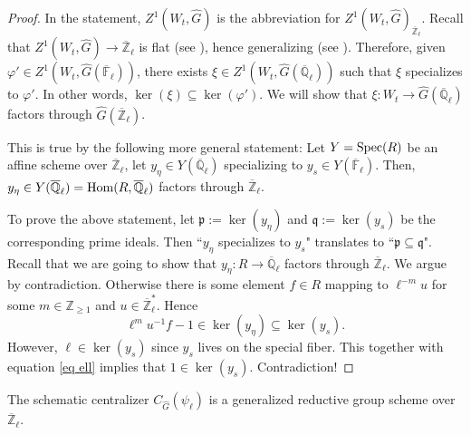 \begin{proof}
	In the statement, $Z^1(W_t, \hat{G})$ is the abbreviation for $Z^1(W_t, \hat{G})_{\overline{\mathbb{Z}}_{\ell}}$. Recall that $Z^1(W_t, \hat{G}) \to \overline{\mathbb{Z}}_{\ell}$ is flat (see \cite[Proposition 3.3]{dat2022ihes}), hence generalizing (see \cite[Stack, Tag 01U2]{stacks-project}). Therefore, given $\varphi' \in Z^1(W_t, \hat{G}(\overline{\mathbb{F}}_{\ell}))$, there exists $\xi \in Z^1(W_t, \hat{G}(\overline{\mathbb{Q}}_{\ell}))$ such that $\xi$ specializes to $\varphi'$. In other words, $\ker(\xi) \subseteq \ker(\varphi')$. We will show that $\xi: W_t \to \hat{G}(\overline{\mathbb{Q}}_{\ell})$ factors through  $\hat{G}(\overline{\mathbb{Z}}_{\ell})$.
	
	This is true by the following more general statement: Let $Y=\operatorname{\operatorname{Spec}}(R)$ be an affine scheme over $\overline{\mathbb{Z}}_{\ell}$, let $y_{\eta} \in Y(\overline{\mathbb{Q}}_{\ell})$ specializing to $y_s \in Y(\overline{\mathbb{F}}_{\ell})$.  Then, $y_{\eta} \in Y(\overline{\mathbb{Q}}_{\ell})=\operatorname{\operatorname{Hom}}(R, \overline{\mathbb{Q}}_{\ell})$ factors through $\overline{\mathbb{Z}}_{\ell}$.
	
    To prove the above statement, let $\mathfrak{p}:=\ker(y_\eta)$ and $\mathfrak{q}:=\ker(y_s)$ be the corresponding prime ideals. Then ``$y_{\eta}$ specializes to $y_s$" translates to ``$\mathfrak{p} \subseteq \mathfrak{q}$". Recall that we are going to show that $y_{\eta}: R \to \overline{\mathbb{Q}}_{\ell}$ factors through $\overline{\mathbb{Z}}_{\ell}$. We argue by contradiction. Otherwise there is some element $f \in R$ mapping to $\ell^{-m}u$ for some $m \in \mathbb{Z}_{\geq 1}$ and $u \in \overline{\mathbb{Z}}_{\ell}^*$. Hence 
    \begin{equation}\label{eq ell}
    	\ell^mu^{-1}f-1 \in \ker(y_{\eta}) \subseteq \ker(y_s).
    \end{equation}
    However, $\ell \in \ker(y_s)$ since $y_s$ lives on the special fiber. This together with equation \eqref{eq ell} implies that $1 \in \ker(y_s)$. Contradiction!
\end{proof}

\begin{lemma}\label{Lem gen red}
	The schematic centralizer $C_{\hat{G}}(\psi_{\ell})$ is a generalized reductive group scheme over $\overline{\mathbb{Z}}_{\ell}$.
\end{lemma}

